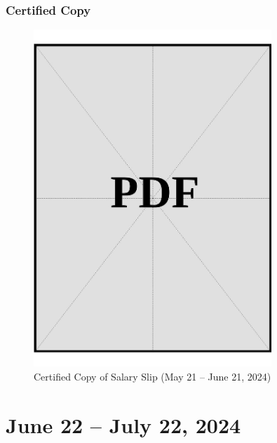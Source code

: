 \clearpage

\subsubsection*{Certified Copy}
\vspace*{\fill}

\begin{figure}[h]
    \centering
    \includegraphics[page=1, width=0.8\textwidth]{../application-docs/sponsor/funds/salary-slips/month-1/certified-copies.pdf}
    \caption{Certified Copy of Salary Slip (May 21 – June 21, 2024)}
    \label{fig:month-1-certified}
\end{figure}

\vspace*{\fill}
\clearpage

\section*{June 22 – July 22, 2024}

